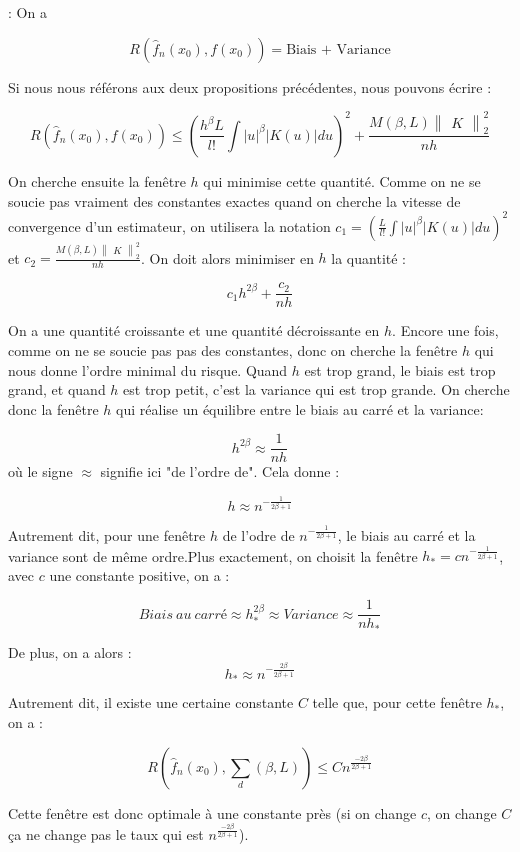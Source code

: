 \documentclass[
]{article}
\begin{document}
\begin{demonstration}: 
  On a

$$
 R(\hat {f}_n(x_0),f(x_0))= \text{Biais + Variance}
$$ 

   Si nous nous référons aux deux propositions précédentes, nous pouvons écrire :

$$
 R(\hat {f}_n(x_0),f(x_0))\leqslant(\frac{h^{\beta}L}{l!}\int |u|^{\beta}|K(u)|du)^2 + \frac{M(\beta,L)\begin{Vmatrix}K\end{Vmatrix}_2^2}{nh}
$$

On cherche ensuite la fenêtre $h$ qui minimise cette quantité. Comme on ne se soucie pas vraiment des constantes exactes quand on cherche la vitesse de convergence d'un estimateur, on utilisera la notation $c_1=(\frac{L}{l!}\int |u|^{\beta}|K(u)|du)^2$ et $c_2=\frac{M(\beta,L)\begin{Vmatrix}K\end{Vmatrix}_2^2}{nh}$. On doit alors minimiser en $h$ la quantité :


$$
  c_1h^{2\beta}+\frac{c_2}{nh}
$$

On a une quantité croissante et une quantité décroissante en $h$. Encore une fois, comme on ne se soucie pas pas des constantes, donc on cherche la fenêtre $h$ qui nous donne l'ordre minimal du risque. Quand $h$ est trop grand, le biais est trop grand, et quand $h$ est trop petit, c'est la variance qui est trop grande. On cherche donc la fenêtre $h$ qui réalise un équilibre entre le biais au carré et la variance:

$$ 
  h^{2\beta}\approx\frac{1}{nh}
$$
où le signe $\approx$ signifie ici "de l'ordre de". Cela donne :

$$
  h\approx n^{-\frac{1}{2\beta +1}}
$$

Autrement dit, pour une fenêtre $h$ de l'odre de $n^{-\frac{1}{2\beta+1}}$, le biais au carré et la variance sont de même ordre.Plus exactement, on choisit la fenêtre $h_*=cn^{-\frac{1}{2\beta+1}}$, avec $c$ une constante positive, on a :

$$
  Biais\ au\ carré \approx h_{*}^{2\beta}\approx Variance\approx \frac{1}{nh_{*}}
$$

De plus, on a alors :
$$
  h_* \approx n^{-\frac{2\beta}{2\beta + 1}}
$$

 
Autrement dit, il existe une certaine constante $C$ telle que, pour cette fenêtre $h_*$, on a :

$$
  R(\hat {f}_n(x_0),\sum_d(\beta,L))\leqslant Cn^{\frac{-2\beta}{2\beta + 1}}
$$

  Cette fenêtre est donc optimale à une constante près (si on change $c$, on change $C$ ça ne change pas le taux qui est $n^{\frac{-2\beta}{2\beta+1}}$).\newline
\end{demonstration}
\end{document}
